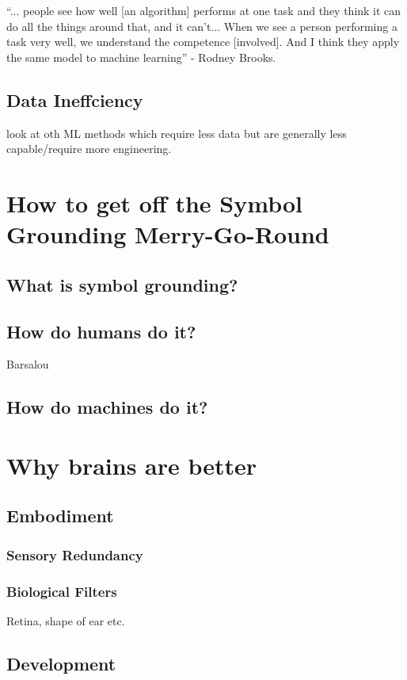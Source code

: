 {\begin{displayquote}
``... people see how well [an algorithm] performs at one task and they think it can do all the things around that, and it can’t... When we see a person performing a task very well, we understand the competence [involved]. And I think they apply the same model to machine learning'' - Rodney Brooks.
\end{displayquote}
\subsection{Data Ineffciency}
look at oth ML methods which require less data but are generally less capable/require more engineering.


\section{How to get off the Symbol Grounding Merry-Go-Round} 
\subsection{What is symbol grounding?}
\subsection{How do humans do it?}
Barsalou

\subsection{How do machines do it?}

\section{Why brains are better}
\subsection{Embodiment}
\subsubsection{Sensory Redundancy}
\subsubsection{Biological Filters}
Retina, shape of ear etc.
\subsection{Development}
}
